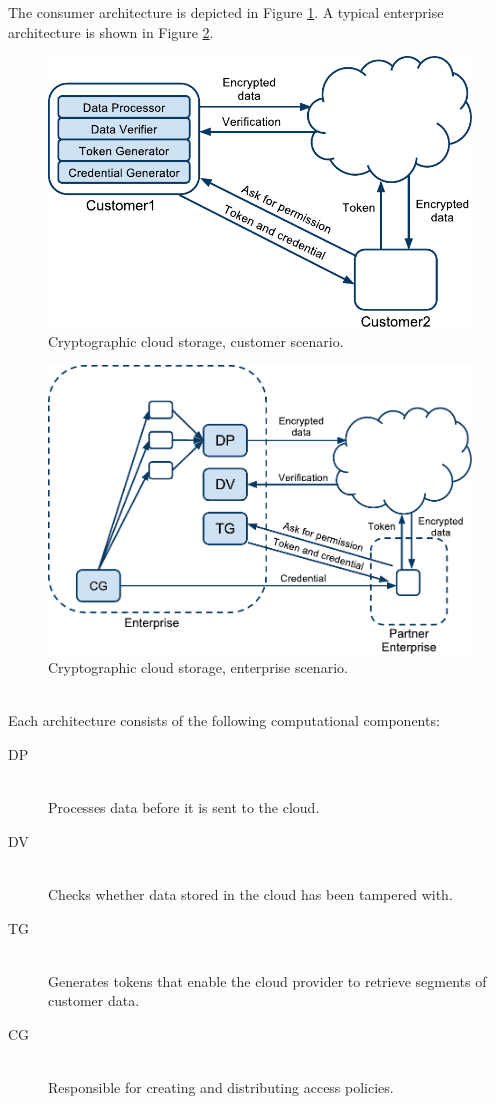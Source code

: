 \documentclass[pdftex,english,10pt,b5paper,twoside]{book}
\begin{document}
The consumer architecture is depicted in Figure \ref{fig:RW:CCS:CA}. A typical
enterprise architecture is shown in Figure \ref{fig:RW:CCS:EA}.
\begin{figure}[h!]
    \centering
    \includegraphics[scale=0.6]{ArchitectureCCSC.pdf}
    \caption{Cryptographic cloud storage, customer scenario.}
    \label{fig:RW:CCS:CA}
\end{figure}
\begin{figure}[h!]
    \centering
    \includegraphics[scale=0.6]{ArchitectureCCSE.pdf}
    \caption{Cryptographic cloud storage, enterprise scenario.}
    \label{fig:RW:CCS:EA}
\end{figure}\\
Each architecture consists of the following computational components:
\begin{description}
\item[\ac{DP}] \hfill \\Processes data before it is sent to the cloud.
\item[\ac{DV}] \hfill \\Checks whether data stored in the cloud has been
tampered with.
\item[\ac{TG}] \hfill \\Generates tokens that enable the cloud provider to
retrieve segments of customer data.
\item[\ac{CG}] \hfill \\Responsible for creating and distributing access 
policies.
\end{description}
\end{document}
